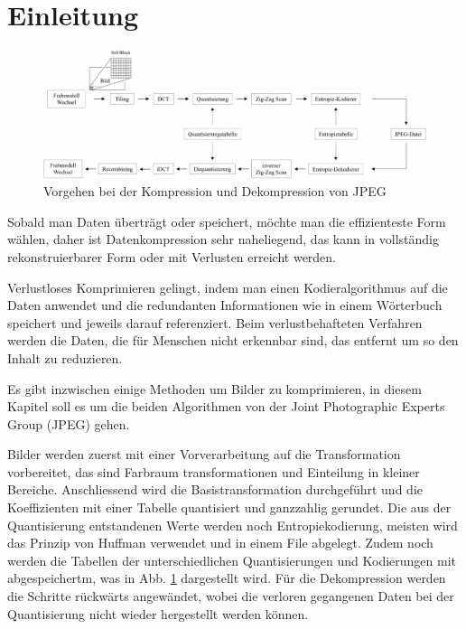 %
%
%
%
\section{Einleitung\label{jpeg:section:einleitung}}
\begin{figure}
    \centering
    \includegraphics[width=\linewidth]{papers/jpeg/pictures/kompressionsschema.pdf}
    \caption{Vorgehen bei der Kompression und Dekompression von JPEG
        \label{jpeg:fig:kompressionsschema}}
\end{figure}
Sobald man Daten überträgt oder speichert, möchte man die effizienteste Form wählen, daher ist Datenkompression sehr naheliegend, das kann in vollständig rekonstruierbarer Form oder mit Verlusten erreicht werden.

Verlustloses Komprimieren gelingt, indem man einen Kodieralgorithmus auf die Daten anwendet und die redundanten Informationen wie in einem Wörterbuch speichert und jeweils darauf referenziert. Beim verlustbehafteten Verfahren werden die Daten, die für Menschen nicht erkennbar sind, das entfernt um so den Inhalt zu reduzieren.

Es gibt inzwischen einige Methoden um Bilder zu komprimieren, in diesem Kapitel soll es um die beiden Algorithmen von der Joint Photographic Experts Group (JPEG) gehen.

Bilder werden zuerst mit einer Vorverarbeitung auf die Transformation vorbereitet, das sind Farbraum transformationen und Einteilung in kleiner Bereiche.
Anschliessend wird die Basistransformation durchgeführt und die Koeffizienten mit einer Tabelle quantisiert und ganzzahlig gerundet.
Die aus der Quantisierung entstandenen Werte werden noch Entropiekodierung, meisten wird das Prinzip von Huffman verwendet und in einem File abgelegt.
Zudem noch werden die Tabellen der unterschiedlichen Quantisierungen und Kodierungen mit abgespeichertm, was in Abb. \ref{jpeg:fig:kompressionsschema} dargestellt wird.
Für die Dekompression werden die Schritte rückwärts angewändet, wobei die verloren gegangenen Daten bei der Quantisierung nicht wieder hergestellt werden können. 

